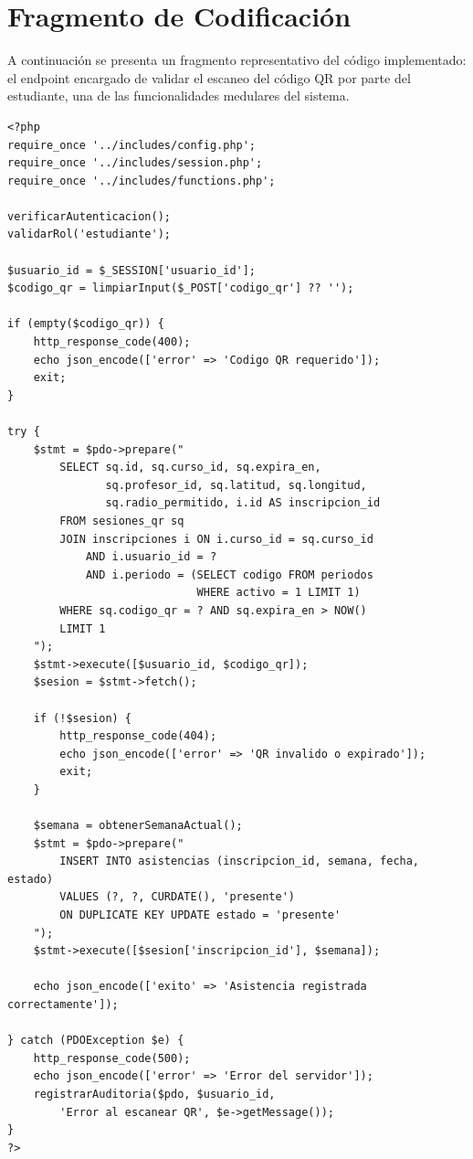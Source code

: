 \documentclass[12pt, letterpaper, oneside]{report}
\begin{document}
\section{Fragmento de Codificaci\'on}

A continuaci\'on se presenta un fragmento representativo del c\'odigo implementado: el endpoint encargado de validar el escaneo del c\'odigo QR por parte del estudiante, una de las funcionalidades medulares del sistema.

\begin{lstlisting}[caption=Fragmento del endpoint de escaneo QR (\texttt{estudiante/escanear\_qr.php})]
<?php
require_once '../includes/config.php';
require_once '../includes/session.php';
require_once '../includes/functions.php';

verificarAutenticacion();
validarRol('estudiante');

$usuario_id = $_SESSION['usuario_id'];
$codigo_qr = limpiarInput($_POST['codigo_qr'] ?? '');

if (empty($codigo_qr)) {
    http_response_code(400);
    echo json_encode(['error' => 'Codigo QR requerido']);
    exit;
}

try {
    $stmt = $pdo->prepare("
        SELECT sq.id, sq.curso_id, sq.expira_en,
               sq.profesor_id, sq.latitud, sq.longitud,
               sq.radio_permitido, i.id AS inscripcion_id
        FROM sesiones_qr sq
        JOIN inscripciones i ON i.curso_id = sq.curso_id
            AND i.usuario_id = ?
            AND i.periodo = (SELECT codigo FROM periodos
                             WHERE activo = 1 LIMIT 1)
        WHERE sq.codigo_qr = ? AND sq.expira_en > NOW()
        LIMIT 1
    ");
    $stmt->execute([$usuario_id, $codigo_qr]);
    $sesion = $stmt->fetch();

    if (!$sesion) {
        http_response_code(404);
        echo json_encode(['error' => 'QR invalido o expirado']);
        exit;
    }

    $semana = obtenerSemanaActual();
    $stmt = $pdo->prepare("
        INSERT INTO asistencias (inscripcion_id, semana, fecha, estado)
        VALUES (?, ?, CURDATE(), 'presente')
        ON DUPLICATE KEY UPDATE estado = 'presente'
    ");
    $stmt->execute([$sesion['inscripcion_id'], $semana]);

    echo json_encode(['exito' => 'Asistencia registrada correctamente']);

} catch (PDOException $e) {
    http_response_code(500);
    echo json_encode(['error' => 'Error del servidor']);
    registrarAuditoria($pdo, $usuario_id,
        'Error al escanear QR', $e->getMessage());
}
?>
\end{lstlisting}
\end{document}
